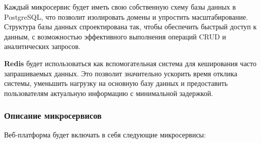 Каждый микросервис будет иметь свою собственную схему базы данных в PostgreSQL, что позволит изолировать домены и упростить масштабирование. Структура базы данных спроектирована так, чтобы обеспечить быстрый доступ к данным, с возможностью эффективного выполнения операций CRUD и аналитических запросов.

\textbf{Redis} будет использоваться как вспомогательная система для кеширования часто запрашиваемых данных. Это позволит значительно ускорить время отклика системы, уменьшить нагрузку на основную базу данных и предоставить пользователям актуальную информацию с минимальной задержкой.

\subsubsection{Описание микросервисов}

Веб-платформа будет включать в себя следующие микросервисы:

